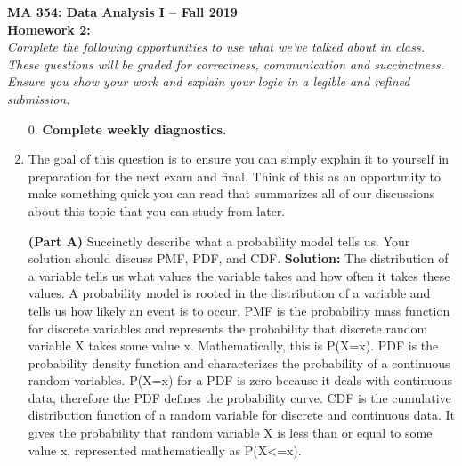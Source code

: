 \documentclass{article}
\begin{document}

\noindent \textbf{MA 354: Data Analysis I -- Fall 2019}\\%
\noindent \textbf{Homework 2:}\vspace{1em}\\
\emph{Complete the following opportunities to use what we've talked about in class. 
These questions will be graded for correctness, communication and succinctness. Ensure
you show your work and explain your logic in a legible and refined submission.}\\

\begin{enumerate}
\item[0.] \textbf{Complete weekly diagnostics.}

\item  The goal of this question is to ensure you can simply explain it to yourself in preparation
for the next exam and final. Think of this as an opportunity to make something 
quick you can read that summarizes all of our discussions about this topic
that you can study from later.

\textbf{(Part A)} Succinctly describe what a probability model tells us. Your solution should
discuss PMF, PDF, and CDF.
\newline
\newline
\textbf{Solution:}
The distribution of a variable tells us what values the variable takes and how often it takes these values. A probability model is rooted in the distribution of a variable and tells us how likely an event is to occur. 
PMF is the probability mass function for discrete variables and represents the probability that discrete random variable X takes some value x. Mathematically, this is P(X=x). 
PDF is the probability density function and characterizes the probability of a continuous random variables. P(X=x) for a PDF is zero because it deals with continuous data, therefore the PDF defines the probability curve. 
CDF is the cumulative distribution function of a random variable for discrete and continuous data. It gives the probability that random variable X is less than or equal to some value x, represented mathematically as P(X<=x).
\newline


\end{enumerate}
\end{document}
